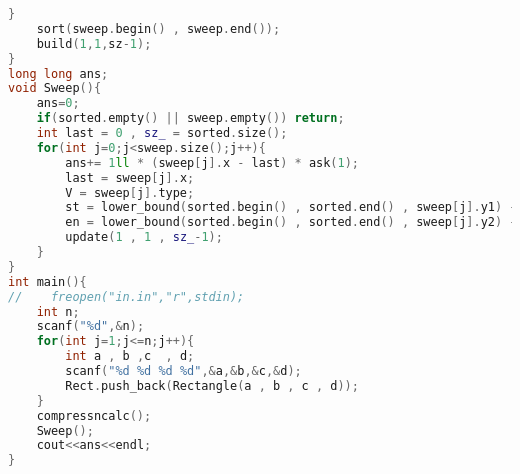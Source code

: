 \documentclass[12pt,a4paper, twoside]{report}
\begin{document}
\begin{lstlisting}[caption=Área da união de retângulos (N log N),language=C++]
    }
    sort(sweep.begin() , sweep.end());
    build(1,1,sz-1);
}
long long ans;
void Sweep(){
    ans=0;
    if(sorted.empty() || sweep.empty()) return;
    int last = 0 , sz_ = sorted.size();
    for(int j=0;j<sweep.size();j++){
        ans+= 1ll * (sweep[j].x - last) * ask(1);
        last = sweep[j].x;
        V = sweep[j].type;
        st = lower_bound(sorted.begin() , sorted.end() , sweep[j].y1) - sorted.begin() + 1;
        en = lower_bound(sorted.begin() , sorted.end() , sweep[j].y2) - sorted.begin();
        update(1 , 1 , sz_-1);
    }
}
int main(){
//    freopen("in.in","r",stdin);
    int n;
    scanf("%d",&n);
    for(int j=1;j<=n;j++){
        int a , b ,c  , d;
        scanf("%d %d %d %d",&a,&b,&c,&d);
        Rect.push_back(Rectangle(a , b , c , d));
    }
    compressncalc();
    Sweep();
    cout<<ans<<endl;
}

\end{lstlisting}
\end{document}
